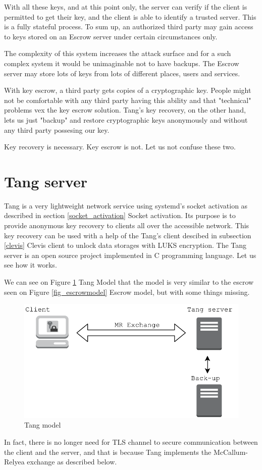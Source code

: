 With all these keys, and at this point only, the server can verify if the client is permitted to get their key, and the client is able to identify a trusted server.
This is a fully stateful process.
To sum up, an authorized third party may gain access to keys stored on an Escrow server under certain circumstances only.

The complexity of this system increases the attack surface and for a such complex system it would be unimaginable not to have backups.
The Escrow server may store lots of keys from lots of different places, users and services.

With key escrow, a third party gets copies of a cryptographic key.
People might not be comfortable with any third party having this ability and that "technical" problems vex the key escrow solution.
Tang's key recovery, on the other hand, lets us just "backup" and restore cryptographic keys anonymously and without any third party possesing our key.

Key recovery is necessary.
Key escrow is not.
Let us not confuse these two.



\section{Tang server}\label{tang}

Tang is a very lightweight network service using systemd's socket activation as described in section \ref{socket_activation} Socket activation.
Its purpose is to provide anonymous key recovery to clients all over the accessible network.
This key recovery can be used with a help of the Tang's client descibed in subsection \ref{clevis} Clevis client to unlock data storages with LUKS encryption.
The Tang server is an open source project implemented in C programming language.
Let us see how it works.

We can see on Figure \ref{fig_tangmodel} Tang Model that the model is very similar to the escrow seen on Figure \ref{fig_escrowmodel} Escrow model, but with some things missing.
\begin{figure}[h]
    \centering
    \includegraphics[scale=0.7]{figures/TangModel.pdf}
    \caption{Tang model}
    \label{fig_tangmodel}
\end{figure}
In fact, there is no longer need for TLS channel to secure communication between the client and the server,
 and that is because Tang implements the McCallum-Relyea exchange as described below.


